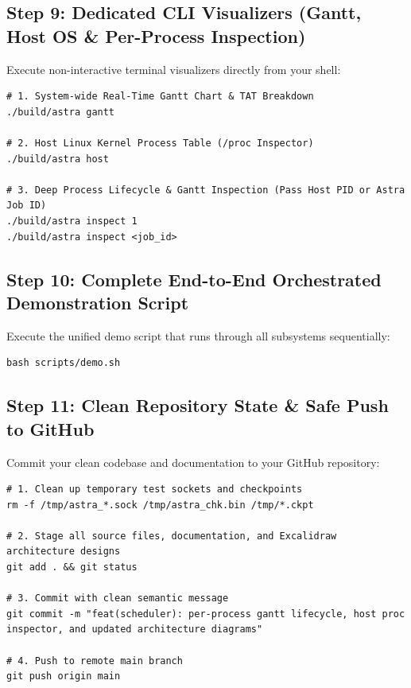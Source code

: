 \documentclass[10pt,a4paper]{article}
\begin{document}
\subsection{Step 9: Dedicated CLI Visualizers (Gantt, Host OS \& Per-Process Inspection)}
Execute non-interactive terminal visualizers directly from your shell:
\begin{lstlisting}[style=cmdstyle]
# 1. System-wide Real-Time Gantt Chart & TAT Breakdown
./build/astra gantt

# 2. Host Linux Kernel Process Table (/proc Inspector)
./build/astra host

# 3. Deep Process Lifecycle & Gantt Inspection (Pass Host PID or Astra Job ID)
./build/astra inspect 1
./build/astra inspect <job_id>
\end{lstlisting}

\subsection{Step 10: Complete End-to-End Orchestrated Demonstration Script}
Execute the unified demo script that runs through all subsystems sequentially:
\begin{lstlisting}[style=cmdstyle]
bash scripts/demo.sh
\end{lstlisting}

\subsection{Step 11: Clean Repository State \& Safe Push to GitHub}
Commit your clean codebase and documentation to your GitHub repository:
\begin{lstlisting}[style=cmdstyle]
# 1. Clean up temporary test sockets and checkpoints
rm -f /tmp/astra_*.sock /tmp/astra_chk.bin /tmp/*.ckpt

# 2. Stage all source files, documentation, and Excalidraw architecture designs
git add . && git status

# 3. Commit with clean semantic message
git commit -m "feat(scheduler): per-process gantt lifecycle, host proc inspector, and updated architecture diagrams"

# 4. Push to remote main branch
git push origin main
\end{lstlisting}
\end{document}
